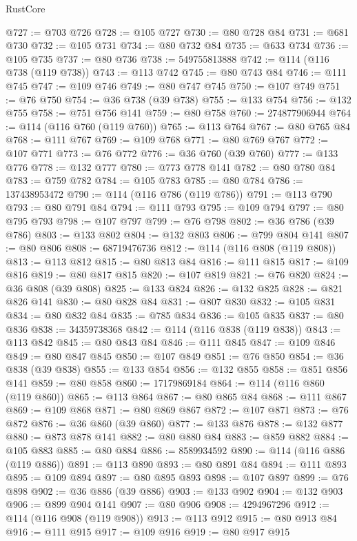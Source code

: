 \begin{lexlean}{RustCore}
\begin{coremodule}
@727 := @703 @726
@728 := @105 @727
@730 := @80 @728 @84
@731 := @681 @730
@732 := @105 @731
@734 := @80 @732 @84
@735 := @633 @734
@736 := @105 @735
@737 := @80 @736
@738 := 549755813888
@742 := @114 (@116 @738 (@119 @738))
@743 := @113 @742
@745 := @80 @743 @84
@746 := @111 @745
@747 := @109 @746
@749 := @80 @747 @745
@750 := @107 @749
@751 := @76 @750
@754 := @36 @738 (@39 @738)
@755 := @133 @754
@756 := @132 @755
@758 := @751 @756 @141
@759 := @80 @758
@760 := 274877906944
@764 := @114 (@116 @760 (@119 @760))
@765 := @113 @764
@767 := @80 @765 @84
@768 := @111 @767
@769 := @109 @768
@771 := @80 @769 @767
@772 := @107 @771
@773 := @76 @772
@776 := @36 @760 (@39 @760)
@777 := @133 @776
@778 := @132 @777
@780 := @773 @778 @141
@782 := @80 @780 @84
@783 := @759 @782
@784 := @105 @783
@785 := @80 @784
@786 := 137438953472
@790 := @114 (@116 @786 (@119 @786))
@791 := @113 @790
@793 := @80 @791 @84
@794 := @111 @793
@795 := @109 @794
@797 := @80 @795 @793
@798 := @107 @797
@799 := @76 @798
@802 := @36 @786 (@39 @786)
@803 := @133 @802
@804 := @132 @803
@806 := @799 @804 @141
@807 := @80 @806
@808 := 68719476736
@812 := @114 (@116 @808 (@119 @808))
@813 := @113 @812
@815 := @80 @813 @84
@816 := @111 @815
@817 := @109 @816
@819 := @80 @817 @815
@820 := @107 @819
@821 := @76 @820
@824 := @36 @808 (@39 @808)
@825 := @133 @824
@826 := @132 @825
@828 := @821 @826 @141
@830 := @80 @828 @84
@831 := @807 @830
@832 := @105 @831
@834 := @80 @832 @84
@835 := @785 @834
@836 := @105 @835
@837 := @80 @836
@838 := 34359738368
@842 := @114 (@116 @838 (@119 @838))
@843 := @113 @842
@845 := @80 @843 @84
@846 := @111 @845
@847 := @109 @846
@849 := @80 @847 @845
@850 := @107 @849
@851 := @76 @850
@854 := @36 @838 (@39 @838)
@855 := @133 @854
@856 := @132 @855
@858 := @851 @856 @141
@859 := @80 @858
@860 := 17179869184
@864 := @114 (@116 @860 (@119 @860))
@865 := @113 @864
@867 := @80 @865 @84
@868 := @111 @867
@869 := @109 @868
@871 := @80 @869 @867
@872 := @107 @871
@873 := @76 @872
@876 := @36 @860 (@39 @860)
@877 := @133 @876
@878 := @132 @877
@880 := @873 @878 @141
@882 := @80 @880 @84
@883 := @859 @882
@884 := @105 @883
@885 := @80 @884
@886 := 8589934592
@890 := @114 (@116 @886 (@119 @886))
@891 := @113 @890
@893 := @80 @891 @84
@894 := @111 @893
@895 := @109 @894
@897 := @80 @895 @893
@898 := @107 @897
@899 := @76 @898
@902 := @36 @886 (@39 @886)
@903 := @133 @902
@904 := @132 @903
@906 := @899 @904 @141
@907 := @80 @906
@908 := 4294967296
@912 := @114 (@116 @908 (@119 @908))
@913 := @113 @912
@915 := @80 @913 @84
@916 := @111 @915
@917 := @109 @916
@919 := @80 @917 @915

\end{coremodule}
\end{lexlean}
